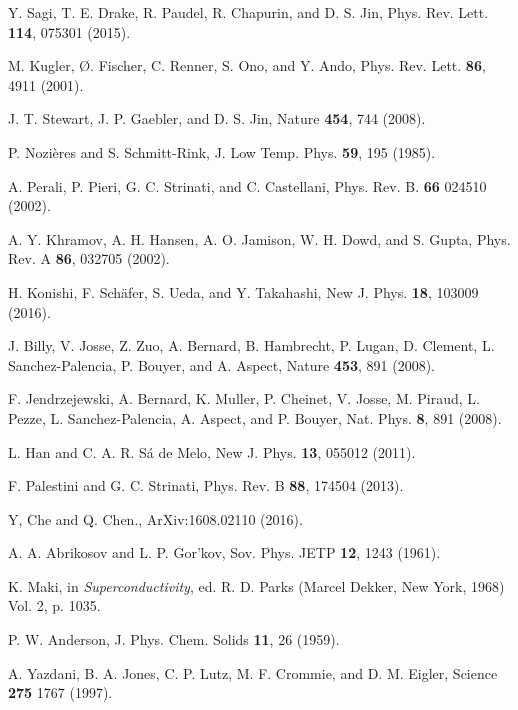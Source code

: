 \documentclass[12pt]{jsbook}
\begin{document}
\begin{thebibliography}{9}
Y. Sagi, T. E. Drake, R. Paudel, R. Chapurin, and D. S. Jin, Phys. Rev. Lett. {\bf 114}, 075301 (2015).

M. Kugler, \O. Fischer, C. Renner, S. Ono, and Y. Ando, Phys. Rev. Lett. {\bf 86}, 4911 (2001).

J. T. Stewart, J. P. Gaebler, and D. S. Jin, Nature {\bf 454}, 744 (2008).

P. Nozi{\`e}res and S. Schmitt-Rink, J. Low Temp. Phys. {\bf 59}, 195 (1985).


A. Perali, P. Pieri, G. C. Strinati, and C. Castellani, Phys. Rev. B. {\bf 66} 024510 (2002).

A. Y. Khramov, A. H. Hansen, A. O. Jamison, W. H. Dowd, and S. Gupta, Phys. Rev. A {\bf 86}, 032705 (2002).

H. Konishi, F. Sch\"{a}fer, S. Ueda, and Y. Takahashi, New J. Phys. {\bf 18}, 103009 (2016).

J. Billy, V. Josse, Z. Zuo, A. Bernard, B. Hambrecht, P. Lugan, D. Clement, L. Sanchez-Palencia, P. Bouyer, and A. Aspect, Nature {\bf 453}, 891 (2008).

F. Jendrzejewski, A. Bernard, K. Muller, P. Cheinet, V. Josse, M. Piraud, L. Pezze, L. Sanchez-Palencia, A. Aspect, and P. Bouyer, Nat. Phys. {\bf 8}, 891 (2008).

L. Han and C. A. R. S\'a de Melo, New J. Phys. {\bf 13}, 055012 (2011).

F. Palestini and G. C. Strinati, Phys. Rev. B {\bf 88}, 174504 (2013).

Y, Che and Q. Chen., ArXiv:1608.02110 (2016).

A. A. Abrikosov and L. P. Gor'kov, Sov. Phys. JETP {\bf 12}, 1243 (1961).

K. Maki, in {\it Superconductivity}, ed. R. D. Parks (Marcel Dekker, New York, 1968) Vol. 2, p. 1035.

P. W. Anderson, J. Phys. Chem. Solids {\bf 11}, 26 (1959).

A. Yazdani, B. A. Jones, C. P. Lutz, M. F. Crommie, and D. M. Eigler, Science {\bf 275} 1767 (1997).


\end{thebibliography}
\end{document}

